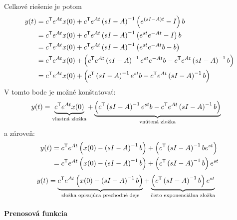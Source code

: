 \documentclass[a4paper, 10pt, ]{article}
\begin{document}
Celkové riešenie je potom
\begin{align}
	\begin{aligned}
		y(t) &= c^{\mathsf{T}} e^{At} x(0) + c^{\mathsf{T}} e^{At} \left( sI - A \right)^{-1}  \left( e^{(sI-A)t} - I \right) b \\
		&= c^{\mathsf{T}} e^{At} x(0) + c^{\mathsf{T}} e^{At} \left( sI - A \right)^{-1}  \left( e^{st} e^{-At} - I \right) b \\
		&= c^{\mathsf{T}} e^{At} x(0) + c^{\mathsf{T}} e^{At} \left( sI - A \right)^{-1}  \left( e^{st} e^{-At}b - b \right) \\
		&= c^{\mathsf{T}} e^{At} x(0) +   \left(c^{\mathsf{T}} e^{At} \left( sI - A \right)^{-1} e^{st} e^{-At}b - c^{\mathsf{T}} e^{At} \left( sI - A \right)^{-1} b \right) \\
		&= c^{\mathsf{T}} e^{At} x(0) +   \left(c^{\mathsf{T}} \left( sI - A \right)^{-1} e^{st} b - c^{\mathsf{T}} e^{At} \left( sI - A \right)^{-1} b \right)
	\end{aligned}
\end{align}
V tomto bode je možné konštatovať:
\begin{align}
	\begin{aligned}
		y(t)
		&=
		\underbrace{
		c^{\mathsf{T}} e^{At} x(0)
		}_{\text{vlastná zložka}}
		+
		\underbrace{
		\left(c^{\mathsf{T}} \left( sI - A \right)^{-1} e^{st} b - c^{\mathsf{T}} e^{At} \left( sI - A \right)^{-1} b \right)
		}_{\text{vnútená zložka}}
	\end{aligned}
\end{align}
a zároveň:
\begin{align}
	\begin{aligned}
		y(t) &= c^{\mathsf{T}} e^{At} \left( x(0) -  \left( sI - A \right)^{-1} b\right) +   \left(c^{\mathsf{T}}  \left( sI - A \right)^{-1}  b e^{st} \right) \\
		&= c^{\mathsf{T}} e^{At} \left( x(0) -  \left( sI - A \right)^{-1} b\right) +   \left(c^{\mathsf{T}}  \left( sI - A \right)^{-1}  b  \right) e^{st}
	\end{aligned}
\end{align}
\begin{align}
	\begin{aligned}
		y(t)
		&=
		\underbrace{
		c^{\mathsf{T}} e^{At} \left( x(0) -  \left( sI - A \right)^{-1} b\right)
		}_{\text{zložka opisujúca prechodné deje}}
		+
		\underbrace{
		\left(c^{\mathsf{T}}  \left( sI - A \right)^{-1}  b  \right) e^{st}
		}_{\text{čisto exponenciálna zložka}}
	\end{aligned}
\end{align}


\paragraph{Prenosová funkcia}
\end{document}
